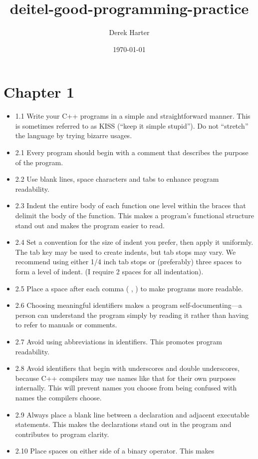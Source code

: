 \documentclass[11pt]{article}
\author{Derek Harter}
\date{\today}
\title{deitel-good-programming-practice}
\begin{document}
\maketitle
\tableofcontents

\section{Chapter 1}
\label{sec-1}

\begin{itemize}
\item 1.1 Write your C++ programs in a simple and straightforward
manner. This is sometimes referred to as KISS (“keep it simple
stupid”). Do not “stretch” the language by trying bizarre usages.
\item 2.1 Every program should begin with a comment that describes the
purpose of the program.
\item 2.2 Use blank lines, space characters and tabs to enhance program readability.
\item 2.3 Indent the entire body of each function one level within the
braces that delimit the body of the function. This makes a program’s
functional structure stand out and makes the program easier to read.
\item 2.4 Set a convention for the size of indent you prefer, then apply
it uniformly. The tab key may be used to create indents, but tab
stops may vary. We recommend using either 1/4 inch tab stops or
(preferably) three spaces to form a level of indent. (I require 2
spaces for all indentation).
\item 2.5 Place a space after each comma ( , ) to make programs more readable.
\item 2.6 Choosing meaningful identifiers makes a program
self-documenting—a person can understand the program simply by
reading it rather than having to refer to manuals or comments.
\item 2.7 Avoid using abbreviations in identifiers. This promotes program
readability.
\item 2.8 Avoid identifiers that begin with underscores and double
underscores, because C++ compilers may use names like that for their
own purposes internally. This will prevent names you choose from
being confused with names the compilers choose.
\item 2.9 Always place a blank line between a declaration and adjacent
executable statements. This makes the declarations stand out in the
program and contributes to program clarity.
\item 2.10 Place spaces on either side of a binary operator. This makes

\end{itemize}
\end{document}
